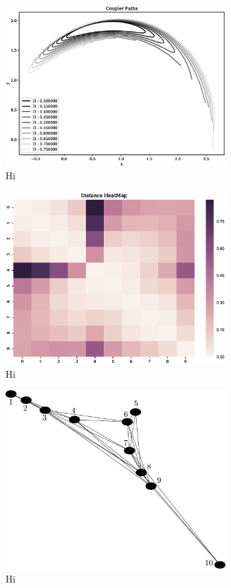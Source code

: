\documentclass[twocolumn,10pt]{asme2ej}
\begin{document}
\begin{figure}
\centering
\includegraphics[width=240pt]{figure/fig_sa_coupler_curves.eps}
  \caption{Hi}
\label{saCouplerCurves}
\end{figure}

\begin{figure}
\centering
\includegraphics[width=240pt]{figure/fig_sa_heatmap.eps}
  \caption{Hi}
\label{saHeatmap}
\end{figure}

\begin{figure}
\centering
\includegraphics[width=240pt]{figure/fig_sa_graph.eps}
  \caption{Hi}
\label{saGraph}
\end{figure}
\end{document}
